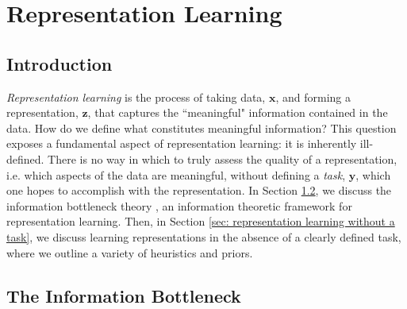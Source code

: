 \chapter{Representation Learning}

\section{Introduction}

\textit{Representation learning} is the process of taking data, $\mathbf{x}$, and forming a representation, $\mathbf{z}$, that captures the ``meaningful" information contained in the data. How do we define what constitutes meaningful information? This question exposes a fundamental aspect of representation learning: it is inherently ill-defined. There is no way in which to truly assess the quality of a representation, i.e. which aspects of the data are meaningful, without defining a \textit{task}, $\mathbf{y}$, which one hopes to accomplish with the representation. In Section \ref{sec: information bottleneck}, we discuss the information bottleneck theory \cite{tishby2000information}, an information theoretic framework for representation learning. Then, in Section \ref{sec: representation learning without a task}, we discuss learning representations in the absence of a clearly defined task, where we outline a variety of heuristics and priors.

\section{The Information Bottleneck}
\label{sec: information bottleneck}

